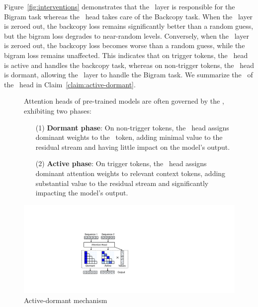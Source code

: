 Figure~\ref{fig:interventions} demonstrates that the \mlp~layer is responsible for the Bigram task whereas the \attn~head takes care of the Backcopy task. When the \mlp~layer is zeroed out, the backcopy loss remains significantly better than a random guess, but the bigram loss degrades to near-random levels. Conversely, when the \attn~layer is zeroed out, the backcopy loss becomes worse than a random guess, while the bigram loss remains unaffected. This indicates that on trigger tokens, the \attn~head is active and handles the backcopy task, whereas on non-trigger tokens, the \attn~head is dormant, allowing the \mlp~layer to handle the Bigram task. We summarize the \activedormant~of the \attn~head in Claim~\ref{claim:active-dormant}.

\begin{figure}[h]
    \centering
    \begin{minipage}{0.65\textwidth}
\begin{claim}
\label{claim:active-dormant}
Attention heads of pre-trained models are often governed by the \activedormant, exhibiting two phases:
\vskip5pt
\begin{itemize}[leftmargin=2em]
\setlength\itemsep{5pt}
\item[\textup{(1)}] \textbf{Dormant phase}: On non-trigger tokens, the \attn~head assigns dominant weights to the \bos~token, adding minimal value to the residual stream and having little impact on the model’s output.
\item[\textup{(2)}] \textbf{Active phase}: On trigger tokens, the \attn~head assigns dominant attention weights to relevant context tokens, adding substantial value to the residual stream and significantly impacting the model’s output. 
\end{itemize}
\end{claim}
    \end{minipage}
    \hfill
    \begin{minipage}{0.33\textwidth}
        \includegraphics[width=0.89\linewidth]{Figures/illustrations/illlustrations_Part1.pdf}
        \vskip-8pt
        \caption{\small Active-dormant mechanism}
        \label{figure:illustrate-active-dormant}
    \end{minipage}%
\end{figure}

